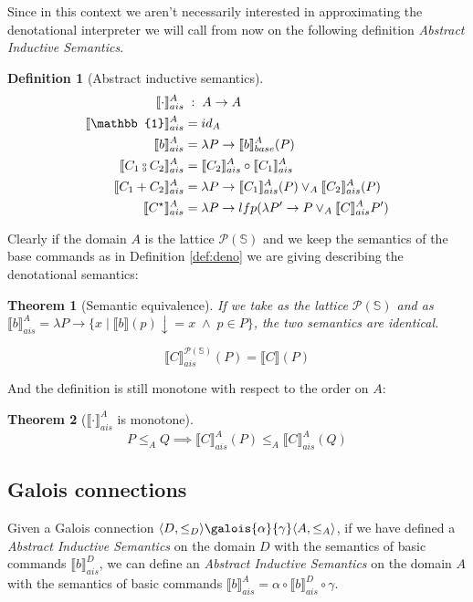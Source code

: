 \documentclass{article}
\newtheorem{definition}{Definition}
\newtheorem{theorem}{Theorem}
\newcommand*{\sem}[1]{
    \llbracket #1 \rrbracket
}
\newcommand{\bca}[2]{
    #2_{ais}^{#1}
}
\newcommand{\bsem}[2][A]{
    \bca{#1}{\sem{#2}}
}
\newcommand{\basesem}[2][A]{
    \sem{#2}_{base}
}
\newcommand{\pow}[1]{
    \mathcal{P}(#1)
}
\def\fcmp{\mathbin{\raise 0.6ex\hbox{\oalign{\hfil$\scriptscriptstyle      
    \mathrm{o}$\hfil\cr\hfil$\scriptscriptstyle\mathrm{9}$\hfil}}}}
\def\state{\mathbb{S}}
\begin{document}
Since in this context we aren't necessarily interested in approximating the
denotational interpreter we will call from now on the following definition
\textit{Abstract Inductive Semantics}.

\begin{definition}[Abstract inductive semantics]
    \begin{align*}
        \bsem{\cdot}         & \;:\; A \rightarrow A \\
        \bsem{\mathbb{1}}    &= id_A \\
        \bsem{b}             &= \lambda P \rightarrow \basesem{b}^A(P) \\
        \bsem{C_1 \fcmp C_2} &= \bsem{C_2} \circ \bsem{C_1} \\
        \bsem{C_1 + C_2}     &= \lambda P \rightarrow \bsem{C_1}(P) \lor_A \bsem{C_2}(P) \\
        \bsem{C^\star}       &= \lambda P \rightarrow lfp(\lambda P' \rightarrow P \lor_A \bsem{C} P')
    \end{align*}
\end{definition}

Clearly if the domain $A$ is the lattice $\pow{\state}$ and we keep the 
semantics of the base commands as in Definition \ref{def:deno} we are giving 
describing the denotational semantics:
\begin{theorem}[Semantic equivalence]
    \label{thm:semeq}
    If we take as the lattice $\pow{\state}$ and as 
    $\bsem{b} = \lambda P \rightarrow 
    \{ x \mid \sem{b}(p)\downarrow = x \; \land \; p \in P \}$, the two 
    semantics are identical.
    
    $$\bsem[\pow{\state}]{C}(P) = \sem{C}(P)$$
\end{theorem}

And the definition is still monotone with respect to the order on $A$:
\begin{theorem}[$\bsem{\cdot}$ is monotone]
    $$P \leq_A Q \implies \bsem{C}(P) \leq_A \bsem{C}(Q)$$
\end{theorem}

\subsection{Galois connections}

Given a Galois connection $\langle D, \leq_D \rangle \galois{\alpha}{\gamma} 
\langle A, \leq_A \rangle$, if we have defined a 
\textit{Abstract Inductive Semantics} on the domain $D$ with the semantics of 
basic commands $\bsem[D]{b}$, we can define an \textit{Abstract Inductive 
Semantics} on the domain $A$ with the semantics of basic 
commands $\bsem[A]{b} = \alpha \circ \bsem[D]{b} \circ \gamma$.
\end{document}
